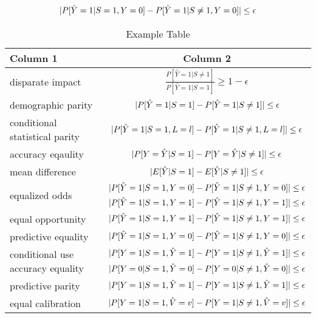 \documentclass[conference]{IEEEtran}
\begin{document}
\begin{align*}
    \lvert P[\hat{Y} = 1 | S = 1, Y = 0] - P[\hat{Y} = 1 | S \neq 1, Y = 0]\rvert \leq \epsilon
\end{align*}

\begin{table*}[h]
    \centering
    \begin{tabular}{|l|c|} %
        \hline
        \textbf{Column 1} & \textbf{Column 2} \\
        \hline
disparate impact & $\frac{P[\hat{Y} = 1 | S \neq 1]}{P[\hat{Y} = 1 | S = 1]} \geq 1 - \epsilon$ \\
\hline
demographic parity & $\lvert P[\hat{Y} = 1 | S = 1] - P[\hat{Y} = 1 | S \neq 1]\rvert \leq \epsilon$ \\
\hline
conditional statistical parity & $\lvert P[\hat{Y} = 1 | S = 1, L = l] - P[\hat{Y} = 1 | S \neq 1, L = l]\rvert \leq \epsilon$ \\
\hline
accuracy eqaulity & $\lvert P[Y = \hat{Y} | S = 1] - P[Y = \hat{Y} | S \neq 1]\rvert \leq \epsilon$ \\
\hline
mean difference & $\lvert E[\hat{Y}|S = 1] - E[\hat{Y}|S \neq 1]\rvert \leq \epsilon$ \\
\hline
\multirow{2}{*}{equalized odds} & $\lvert P[\hat{Y} = 1 | S = 1, Y = 0] - P[\hat{Y} = 1 | S \neq 1, Y = 0]\rvert \leq \epsilon$ \\
\cline{2-2}
                                & $\lvert P[\hat{Y} = 1 | S = 1, Y = 1] - P[\hat{Y} = 1 | S \neq 1, Y = 1]\rvert \leq \epsilon$ \\
\hline
equal opportunity & $\lvert P[\hat{Y} = 1 | S = 1, Y = 1] - P[\hat{Y} = 1 | S \neq 1, Y = 1]\rvert \leq \epsilon$ \\
\hline
predictive equality & $\lvert P[\hat{Y} = 1 | S = 1, Y = 0] - P[\hat{Y} = 1 | S \neq 1, Y = 0]\rvert \leq \epsilon$ \\
\hline
\multirow{2}{*}{conditional use accuracy equality} & $\lvert P[Y = 1 | S = 1, \hat{Y} = 1] - P[Y = 1 | S \neq 1, \hat{Y} = 1]\rvert \leq \epsilon$ \\
\cline{2-2}
                                 & $\lvert P[Y = 0 | S = 1, \hat{Y} = 0] - P[Y = 0 | S \neq 1, \hat{Y} = 0]\rvert \leq \epsilon$ \\
\hline
predictive parity & $\lvert P[Y = 1 | S = 1, \hat{Y} = 1] - P[Y = 1 | S \neq 1, \hat{Y} = 1]\rvert \leq \epsilon$ \\
\hline
equal calibration & $\lvert P[Y = 1 | S = 1, \hat{V} = v] - P[Y = 1 | S \neq 1, \hat{V} = v]\rvert \leq \epsilon$ \\
\hline
    \end{tabular}
    \caption{Example Table}
    \label{tab:example}
\end{table*}













\end{document}

